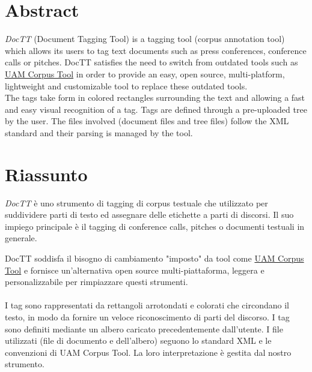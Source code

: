 \documentclass[twoside]{supsistudent}
\begin{document}
\maketitle
\onehalfspacing
\frontmatter


\tableofcontents
\listoffigures					%
\listoftables					%

\newpage
\mainmatter
{}
\setcounter{page}{1}

\chapter*{Abstract}
\textit{DocTT} (Document Tagging Tool) is a tagging tool (corpus annotation 
tool) which allows its users to tag text documents such as press conferences,
conference calls or pitches.
DocTT satisfies the need to switch from outdated tools such as 
\href{http://www.corpustool.com/}{UAM Corpus Tool} in order to provide an easy,
open source, multi-platform, lightweight and customizable tool to replace 
these outdated tools. \\
The tags take form in colored rectangles surrounding the text and allowing 
a fast and easy visual recognition of a tag.
Tags are defined through a pre-uploaded tree by the user. The files involved
(document files and tree files) follow the XML standard and their parsing is 
managed by the tool.

\chapter*{Riassunto}
\textit{DocTT} è uno strumento di tagging di corpus testuale che utilizzato per
suddividere parti di testo ed assegnare delle etichette a parti di discorsi.
Il suo impiego principale è il tagging di conference calls, pitches o documenti
testuali in generale.

DocTT soddisfa il bisogno di cambiamento "imposto" da tool come 
\href{http://www.corpustool.com/}{UAM Corpus Tool} e fornisce 
un'alternativa open source multi-piattaforma, leggera e personalizzabile
per rimpiazzare questi strumenti. \\
\\
I tag sono rappresentati da rettangoli arrotondati e colorati che
circondano il testo, in modo da fornire un veloce riconoscimento di parti del
discorso. I tag sono definiti mediante un albero caricato precedentemente
dall'utente. I file utilizzati (file di documento e dell'albero) seguono
lo standard XML e le convenzioni di UAM Corpus Tool. La loro interpretazione
è gestita dal nostro strumento.
\end{document}
